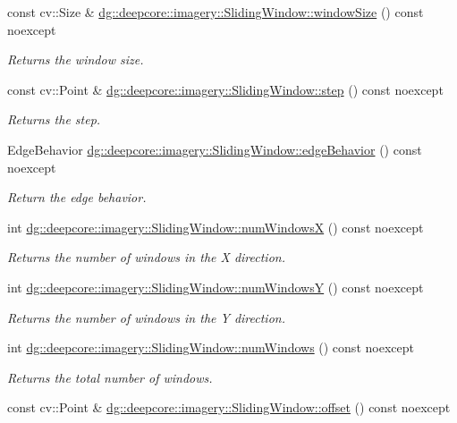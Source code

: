 \begin{DoxyCompactItemize}
const cv\+::\+Size \& \hyperlink{group___imagery_module_ga7d3254b7d65021c7f0464c2424479de1}{dg\+::deepcore\+::imagery\+::\+Sliding\+Window\+::window\+Size} () const noexcept
\begin{DoxyCompactList}\small\item\em Returns the window size. \end{DoxyCompactList}\item 
const cv\+::\+Point \& \hyperlink{group___imagery_module_gaa5f0a9213abf71efe1d51e6da9fc0163}{dg\+::deepcore\+::imagery\+::\+Sliding\+Window\+::step} () const noexcept
\begin{DoxyCompactList}\small\item\em Returns the step. \end{DoxyCompactList}\item 
Edge\+Behavior \hyperlink{group___imagery_module_ga069cd456276d030f571f59d1f04be74c}{dg\+::deepcore\+::imagery\+::\+Sliding\+Window\+::edge\+Behavior} () const noexcept
\begin{DoxyCompactList}\small\item\em Return the edge behavior. \end{DoxyCompactList}\item 
int \hyperlink{group___imagery_module_ga32af1d9b6602d69bd6e000c95b6c17d6}{dg\+::deepcore\+::imagery\+::\+Sliding\+Window\+::num\+WindowsX} () const noexcept
\begin{DoxyCompactList}\small\item\em Returns the number of windows in the X direction. \end{DoxyCompactList}\item 
int \hyperlink{group___imagery_module_gab7406512817ad61129d28a1315932fce}{dg\+::deepcore\+::imagery\+::\+Sliding\+Window\+::num\+WindowsY} () const noexcept
\begin{DoxyCompactList}\small\item\em Returns the number of windows in the Y direction. \end{DoxyCompactList}\item 
int \hyperlink{group___imagery_module_gadcf0dadb638b7a12ce4b43c1a769279c}{dg\+::deepcore\+::imagery\+::\+Sliding\+Window\+::num\+Windows} () const noexcept
\begin{DoxyCompactList}\small\item\em Returns the total number of windows. \end{DoxyCompactList}\item 
const cv\+::\+Point \& \hyperlink{group___imagery_module_gaab719997b423835ef06be24b605a9bc6}{dg\+::deepcore\+::imagery\+::\+Sliding\+Window\+::offset} () const noexcept

\end{DoxyCompactItemize}
